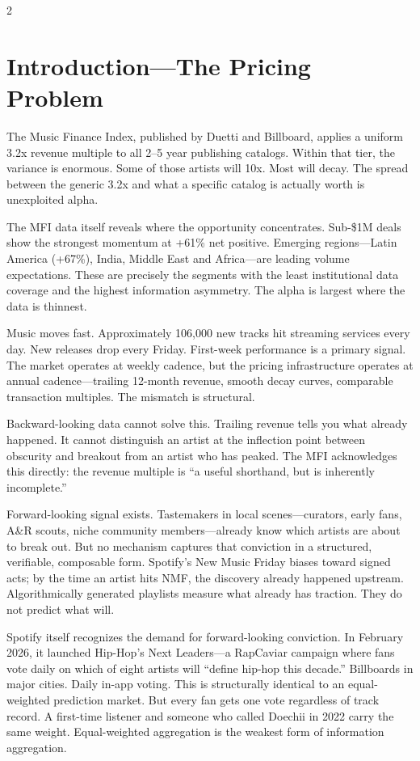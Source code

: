 \documentclass[9pt,oneside]{amsart}
\begin{document}
\begin{multicols}{2}

\section{Introduction---The Pricing Problem}

The Music Finance Index, published by Duetti and Billboard, applies a uniform 3.2x revenue multiple to all 2--5 year publishing catalogs. Within that tier, the variance is enormous. Some of those artists will 10x. Most will decay. The spread between the generic 3.2x and what a specific catalog is actually worth is unexploited alpha.

The MFI data itself reveals where the opportunity concentrates. Sub-\$1M deals show the strongest momentum at +61\% net positive. Emerging regions---Latin America (+67\%), India, Middle East and Africa---are leading volume expectations. These are precisely the segments with the least institutional data coverage and the highest information asymmetry. The alpha is largest where the data is thinnest.

Music moves fast. Approximately 106,000 new tracks hit streaming services every day. New releases drop every Friday. First-week performance is a primary signal. The market operates at weekly cadence, but the pricing infrastructure operates at annual cadence---trailing 12-month revenue, smooth decay curves, comparable transaction multiples. The mismatch is structural.

Backward-looking data cannot solve this. Trailing revenue tells you what already happened. It cannot distinguish an artist at the inflection point between obscurity and breakout from an artist who has peaked. The MFI acknowledges this directly: the revenue multiple is ``a useful shorthand, but is inherently incomplete.''

Forward-looking signal exists. Tastemakers in local scenes---curators, early fans, A\&R scouts, niche community members---already know which artists are about to break out. But no mechanism captures that conviction in a structured, verifiable, composable form. Spotify's New Music Friday biases toward signed acts; by the time an artist hits NMF, the discovery already happened upstream. Algorithmically generated playlists measure what already has traction. They do not predict what will.

Spotify itself recognizes the demand for forward-looking conviction. In February 2026, it launched Hip-Hop's Next Leaders---a RapCaviar campaign where fans vote daily on which of eight artists will ``define hip-hop this decade.'' Billboards in major cities. Daily in-app voting. This is structurally identical to an equal-weighted prediction market. But every fan gets one vote regardless of track record. A first-time listener and someone who called Doechii in 2022 carry the same weight. Equal-weighted aggregation is the weakest form of information aggregation.


\end{multicols}
\end{document}
